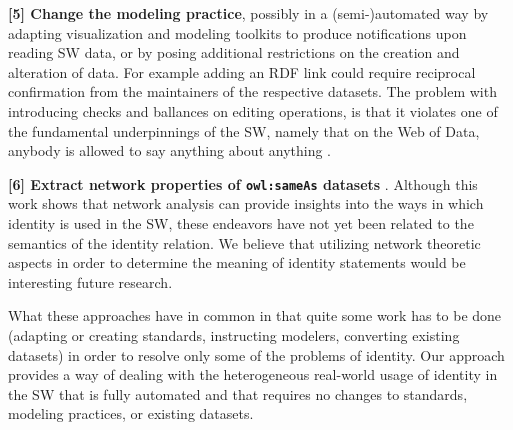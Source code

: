 \textbf{[5] Change the modeling practice}, possibly in a (semi-)automated way
  by adapting visualization and modeling toolkits to produce notifications
  upon reading SW data, or by posing additional restrictions on the creation
  and alteration of data. For example adding an RDF link could require
  reciprocal confirmation from the maintainers of the respective datasets.
  \cite{HalpinHayes2010,DingShinavierFininMcguinness2010}
The problem with introducing checks and ballances on editing operations,
  is that it violates one of the fundamental underpinnings of the SW,
  namely that on the Web of Data, anybody is allowed to say
  anything about anything \cite{AntoniouGrothHarmelenHoekstra2012}.

\textbf{[6] Extract network properties of {\small \texttt{owl:sameAs}}
  datasets} \cite{DingShinavierShangguanMcguinness2010}.
Although this work shows that network analysis can provide insights
  into the ways in which identity is used in the SW,
  these endeavors have not yet been related to the semantics of the
  identity relation.
We believe that utilizing network theoretic aspects in order to
  determine the meaning of identity statements
  would be interesting future research.

What these approaches have in common in that quite some work has to be done
  (adapting or creating standards, instructing modelers, converting existing
  datasets) in order to resolve only some of the problems of identity.
Our approach provides a way of dealing with the heterogeneous real-world
  usage of identity in the SW that is fully automated and that requires
  no changes to standards, modeling practices, or existing datasets.
